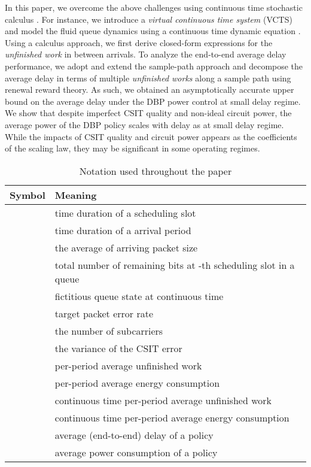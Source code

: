 \documentclass[11pt,journal, onecolumn]{./IEEEtran}
\newcommand{\red}{\color{black}}
\begin{document}
In this paper, we overcome the above challenges using continuous time stochastic calculus \cite{kushner_numerical_2001, bertsekas_dynamic_2007}. For instance, we introduce a {\em virtual continuous time system} (VCTS) and model the fluid queue dynamics using a continuous time dynamic equation \cite{zafer_calculus_2005, zafer_minimum_2009}. Using a calculus approach, we first derive closed-form expressions for the {\em unfinished work} in between arrivals. To analyze the end-to-end average delay performance, we adopt and extend the sample-path approach \cite{bertsekas_dynamic_2007} and decompose the average delay in terms of multiple {\em \red unfinished works} along a sample path using renewal reward theory. As such, we obtained an asymptotically accurate upper bound on the average delay under the DBP power control at small delay regime. We show that despite imperfect CSIT quality and non-ideal circuit power, the average power  of the DBP policy scales with delay  as  at small delay regime. {\red While the impacts of CSIT quality and circuit power appears as the coefficients of the scaling law, they may be significant in some operating regimes.}
\begin{table}[b!]
\renewcommand{\arraystretch}{0.6}
\caption{Notation used throughout the paper}
\label{tab_not}
\centering
\begin{tabular}{|c|l|} \hline
{Symbol}& {Meaning}   \\

\hline
  & time duration of a scheduling slot\\
  & time duration of a arrival period\\
  & the average of arriving packet size\\
   & total number of remaining bits at -th scheduling slot in a queue\\
   & fictitious queue state at continuous time \\
  & target packet error rate \\
  & the number of subcarriers\\
  & the variance of the CSIT error \\
   & per-period average unfinished work   \\
   & per-period average energy consumption  \\
   & continuous time per-period average unfinished work \\
   & continuous time per-period average energy consumption \\
   & average (end-to-end) delay of a policy \\
   & average power consumption of a policy  \\
\hline
\end{tabular}
\end{table}
\end{document}
